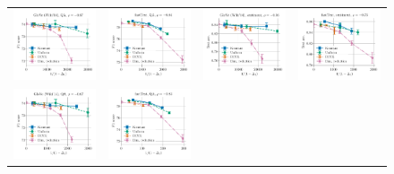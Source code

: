 \begin{figure}
	\centering
	\begin{tabular}{@{\hskip -0.0in}c@{\hskip -0.0in}c@{\hskip -0.0in}c@{\hskip -0.0in}c@{\hskip -0.0in}}
		\includegraphics[width=.245\linewidth]{figures/glove400k_qa_best-f1_vs_gram-large-dim-delta1-0-trans_linx_stoc.pdf} &
		\includegraphics[width=.245\linewidth]{figures/fasttext1m_qa_best-f1_vs_gram-large-dim-delta1-0-trans_linx_stoc.pdf} &
		\includegraphics[width=.245\linewidth]{figures/glove400k_sentiment_sst_test-acc_vs_gram-large-dim-delta1-0-trans_linx_stoc.pdf} &
		\includegraphics[width=.245\linewidth]{figures/fasttext1m_sentiment_sst_test-acc_vs_gram-large-dim-delta1-0-trans_linx_stoc.pdf} \\ [-1em]
		\includegraphics[width=.245\linewidth]{figures/glove400k_qa_best-f1_vs_gram-large-dim-delta1-1-trans_linx_stoc.pdf} &
		\includegraphics[width=.245\linewidth]{figures/fasttext1m_qa_best-f1_vs_gram-large-dim-delta1-1-trans_linx_stoc.pdf} &

\end{tabular}
\end{figure}
